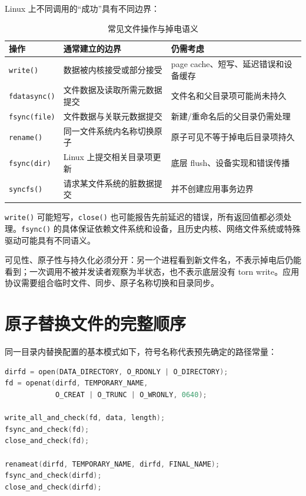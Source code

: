 Linux 上不同调用的“成功”具有不同边界：

\begin{table}[H]
  \centering
  \caption{常见文件操作与掉电语义}
  \begin{tabular}{p{29mm}p{48mm}p{52mm}}
    \hline
    操作 & 通常建立的边界 & 仍需考虑 \\
    \hline
    \texttt{write()} & 数据被内核接受或部分接受 & page cache、短写、延迟错误和设备缓存 \\
    \texttt{fdatasync()} & 文件数据及读取所需元数据提交 & 文件名和父目录项可能尚未持久 \\
    \texttt{fsync(file)} & 文件数据与关联元数据提交 & 新建/重命名后的父目录仍需处理 \\
    \texttt{rename()} & 同一文件系统内名称切换原子 & 原子可见不等于掉电后目录项持久 \\
    \texttt{fsync(dir)} & Linux 上提交相关目录项更新 & 底层 flush、设备实现和错误传播 \\
    \texttt{syncfs()} & 请求某文件系统的脏数据提交 & 并不创建应用事务边界 \\
    \hline
  \end{tabular}
\end{table}

\texttt{write()} 可能短写，\texttt{close()} 也可能报告先前延迟的错误，所有返回值都必须处理。\texttt{fsync()} 的具体保证依赖文件系统和设备，且历史内核、网络文件系统或特殊驱动可能具有不同语义\cite{linux-fsync-man}。

可见性、原子性与持久化必须分开：另一个进程看到新文件名，不表示掉电后仍能看到；一次调用不被并发读者观察为半状态，也不表示底层没有 torn write。应用协议需要组合临时文件、同步、原子名称切换和目录同步。

\section{原子替换文件的完整顺序}

同一目录内替换配置的基本模式如下，符号名称代表预先确定的路径常量：

\begin{lstlisting}[language=C,caption={持久化替换配置文件的基本顺序（伪代码）}]
dirfd = open(DATA_DIRECTORY, O_RDONLY | O_DIRECTORY);
fd = openat(dirfd, TEMPORARY_NAME,
            O_CREAT | O_TRUNC | O_WRONLY, 0640);

write_all_and_check(fd, data, length);
fsync_and_check(fd);
close_and_check(fd);

renameat(dirfd, TEMPORARY_NAME, dirfd, FINAL_NAME);
fsync_and_check(dirfd);
close_and_check(dirfd);
\end{lstlisting}

